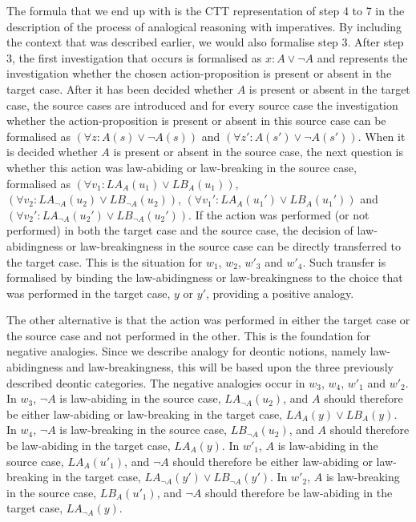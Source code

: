 		
			
		The formula that we end up with is the CTT representation of step 4 to 7 in the description of the process of analogical reasoning with imperatives. By including the context that was described earlier, we would also formalise step 3. After step 3, the first investigation that occurs is formalised as $x : A \lor \neg A$ and represents the investigation whether the chosen action-proposition is present or absent in the target case. After it has been decided whether $A$ is present or absent in the target case, the source cases are introduced and for every source case the investigation whether the action-proposition is present or absent in this source case can be formalised as $(\forall z : A(s) \lor \neg A(s))$ and $(\forall z' : A(s') \lor \neg A(s'))$. When it is decided whether $A$ is present or absent in the source case, the next question is whether this action was law-abiding or law-breaking in the source case, formalised as $(\forall v_1 : LA_A (u_1) \lor LB_A (u_1))$, $(\forall v_2 : LA_{\neg A} (u_2) \lor LB_{\neg A} (u_2))$, $(\forall v_1' : LA_A (u_1') \lor LB_A (u_1'))$ and $(\forall v_2' : LA_{\neg A} (u_2') \lor LB_{\neg A} (u_2'))$. If the action was performed (or not performed) in both the target case and the source case, the decision of law-abidingness or law-breakingness in the source case can be directly transferred to the target case. This is the situation for $w_1$, $w_2$, $w'_3$ and $w'_4$. Such transfer is formalised by binding the law-abidingness or law-breakingness to the choice that was performed in the target case, $y$ or $y'$, providing a positive analogy. 
		
		The other alternative is that the action was performed in either the target case or the source case and not performed in the other. This is the foundation for negative analogies. Since we describe analogy for deontic notions, namely law-abidingness and law-breakingness, this will be based upon the three previously described deontic categories. The negative analogies occur in $w_3$, $w_4$, $w'_1$ and $w'_2$. In $w_3$, $\neg A$ is law-abiding in the source case, $LA_{\neg A}(u_2)$, and $A$ should therefore be either law-abiding or law-breaking in the target case, $LA_A(y) \lor LB_A(y)$. In $w_4$, $\neg A$ is law-breaking in the source case, $LB_{\neg A}(u_2)$, and $A$ should therefore be law-abiding in the target case, $LA_A(y)$. In $w'_1$, $A$ is law-abiding in the source case, $LA_A(u'_1)$, and $\neg A$ should therefore be either law-abiding or law-breaking in the target case, $LA_{\neg A}(y') \lor LB_{\neg A}(y')$. In $w'_2$, $A$ is law-breaking in the source case, $LB_A(u'_1)$, and $\neg A$ should therefore be law-abiding in the target case, $LA_{\neg A}(y)$. 
		
